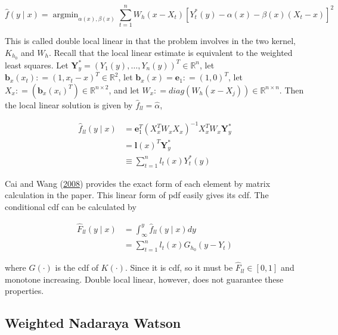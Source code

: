 \documentclass[
]{article}
\theoremstyle{definition}
\theoremstyle{definition}
\theoremstyle{definition}
\theoremstyle{remark}
\begin{document}
\begin{equation}
  \hat{f}(y \mid x) = \mathop{\mathrm{argmin}}_{\alpha(x), \beta(x)} \sum_{t = 1}^n W_h (x - X_t) \left[ Y_t^{\ast}(y) - \alpha(x) - \beta(x) (X_t - x) \right]^2
  \label{eq:doublell}
\end{equation}

This is called double local linear in that the problem involves in the two kernel, \(K_{h_0}\) and \(W_h\). Recall that the local linear estimate is equivalent to the weighted least squares. Let \(\mathbf{Y}_y^{\ast} = \left( Y_1(y), \ldots, Y_n(y) \right)^T \in \mathbb{R}^n\), let \(\mathbf{b}_x(x_t) \mathpunct{:}=(1, x_t - x)^T \in \mathbb{R}^2\), let \(\mathbf{b}_x(x) = \mathbf{e}_1 \mathpunct{:}=(1, 0)^T\), let \(X_x \mathpunct{:}=\left( \mathbf{b}_x(x_i)^T \right) \in \mathbb{R}^{n \times 2}\), and let \(W_x \mathpunct{:}=diag(W_h(x - X_j)) \in \mathbb{R}^{n \times n}\). Then the local linear solution is given by \(\hat{f}_{ll} = \hat\alpha\),

\begin{equation}
  \begin{split}
    \hat{f}_{ll}(y \mid x) & = \mathbf{e}_1^T (X_x^T W_x X_x)^{-1} X_x^T W_x \mathbf{Y}_y^{\ast} \\
    & = \mathbf{l}(x)^T \mathbf{Y}_y^{\ast} \\
    & \equiv \sum_{t = 1}^n l_t(x) Y_t^{\ast}(y)
  \end{split}
  \label{eq:llsolution}
\end{equation}

Cai and Wang (\protect\hyperlink{ref-cai:2008aa}{2008}) provides the exact form of each element by matrix calculation in the paper. This linear form of pdf easily gives its cdf. The conditional cdf can be calculated by

\begin{equation*}
  \begin{split}
    \hat{F}_{ll}(y \mid x) & = \int_\infty^y \hat{f}_{ll}(y \mid x) dy \\
    & = \sum_{t = 1}^n l_t(x) G_{h_0}(y - Y_t)
  \end{split}
\end{equation*}

where \(G(\cdot)\) is the cdf of \(K(\cdot)\). Since it is cdf, so it must be \(\hat{F}_{ll} \in [0, 1]\) and monotone increasing. Double local linear, however, does not guarantee these properties.

\hypertarget{weighted-nadaraya-watson}{%
\subsection{Weighted Nadaraya Watson}\label{weighted-nadaraya-watson}}
\end{document}
